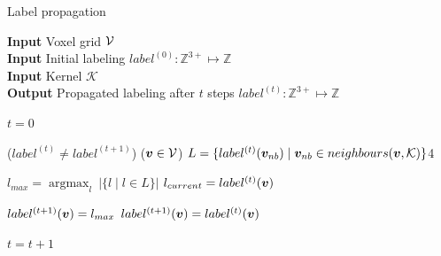 \begin{algorithm}
    \caption{Label propagation}
    \hspace*{\algorithmicindent} \textbf{Input} Voxel grid \(\mathcal{V}\) \\
    \hspace*{\algorithmicindent} \textbf{Input} Initial labeling \(label^{(0)}: \mathbb{Z}^{3+} \mapsto \mathbb{Z}\) \\
    \hspace*{\algorithmicindent} \textbf{Input}  Kernel \(\mathcal{K}\) \\
    \hspace*{\algorithmicindent} \textbf{Output} Propagated labeling after \(t\) steps \(label^{(t)}: \mathbb{Z}^{3+} \mapsto \mathbb{Z}\) \\

    \begin{algorithmic}
    \label{algo:label_prop}
    \State $t=0$

    \While($label^{(t)} \neq label^{(t+1)}$) 
        \ForEach($\boldsymbol{v} \in \mathcal{V}$)
            \State $L = \{label^{(t)}(\boldsymbol{v}_{nb}) \mid \boldsymbol{v}_{nb} \in neighbours(\boldsymbol{v}, \mathcal{K})\}$4

            \State $l_{max} = \mathop{argmax}_{l} \ |\{l \mid l \in L\}|$ 
            \State $l_{current} = label^{(t)}(\boldsymbol{v})$  

                \State \(label^{(t+1)}(\boldsymbol{v}) = l_{max}\)
            \Else
                \State \(label^{(t+1)}(\boldsymbol{v}) = label^{(t)}(\boldsymbol{v})\)
            \EndIf
        \EndFor

        \State $t = t+1$ 
    \EndWhile
    \end{algorithmic}
\end{algorithm}


